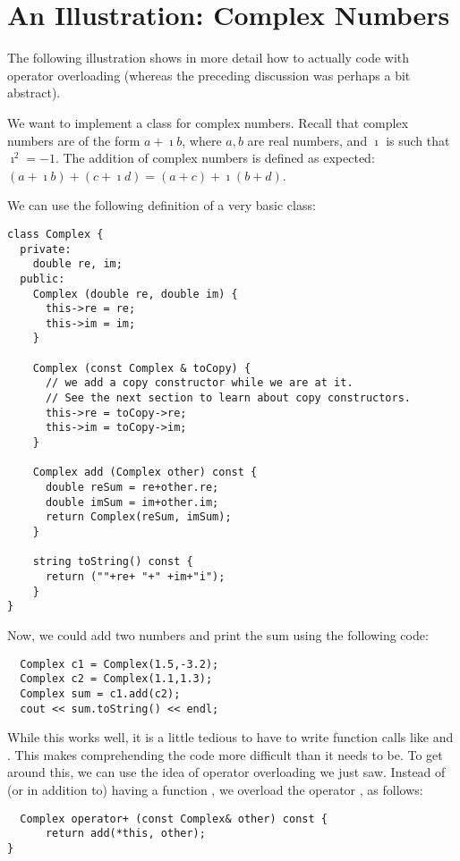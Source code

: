 \section{An Illustration: Complex Numbers}
The following illustration shows in more detail how to actually code
with operator overloading 
(whereas the preceding discussion was perhaps a bit abstract). 

We want to implement a class for complex numbers.
Recall that complex numbers are of the form $a+\imath b$, where $a,b$ are
real numbers, and $\imath$ is such that $\imath^2 = -1$.
The addition of complex numbers is defined as expected:
$(a+\imath b) + (c+\imath d) = (a+c)+\imath (b+d)$.

We can use the following definition of a very basic 
class: 

\begin{verbatim}
class Complex {
  private:
    double re, im;	
  public:
    Complex (double re, double im) {
      this->re = re;
      this->im = im;
    }

    Complex (const Complex & toCopy) {
      // we add a copy constructor while we are at it.
      // See the next section to learn about copy constructors.
      this->re = toCopy->re;
      this->im = toCopy->im;
    }

    Complex add (Complex other) const {
      double reSum = re+other.re;
      double imSum = im+other.im;
      return Complex(reSum, imSum);
    }

    string toString() const {
      return (""+re+ "+" +im+"i");
    }
}
\end{verbatim}

Now, we could add two  numbers and print the sum using
the following code:
\begin{verbatim}
  Complex c1 = Complex(1.5,-3.2);
  Complex c2 = Complex(1.1,1.3);
  Complex sum = c1.add(c2);
  cout << sum.toString() << endl;
\end{verbatim}
	
While this works well, it is a little tedious to have to write
function calls like  and . 
This makes comprehending the code more difficult than it needs to be. 
To get around this, we can use the idea of operator overloading we
just saw.
Instead of (or in addition to) having a function ,
we overload the operator \code{+}, as follows:
\begin{verbatim}
  Complex operator+ (const Complex& other) const {
      return add(*this, other);
}
\end{verbatim}
		
